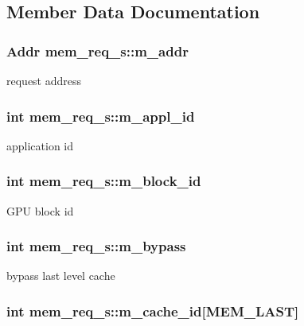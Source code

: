 \subsection{Member Data Documentation}
\hypertarget{structmem__req__s_a835153e595f8931c1259d7074c6f1019}{
\subsubsection[{m\_\-addr}]{\setlength{\rightskip}{0pt plus 5cm}Addr {\bf mem\_\-req\_\-s::m\_\-addr}}}
\label{structmem__req__s_a835153e595f8931c1259d7074c6f1019}
request address \hypertarget{structmem__req__s_a256acada11160343b8fd7b0f410c80c8}{
\subsubsection[{m\_\-appl\_\-id}]{\setlength{\rightskip}{0pt plus 5cm}int {\bf mem\_\-req\_\-s::m\_\-appl\_\-id}}}
\label{structmem__req__s_a256acada11160343b8fd7b0f410c80c8}
application id \hypertarget{structmem__req__s_ad160765e9454b1e36dc188805585a3ff}{
\subsubsection[{m\_\-block\_\-id}]{\setlength{\rightskip}{0pt plus 5cm}int {\bf mem\_\-req\_\-s::m\_\-block\_\-id}}}
\label{structmem__req__s_ad160765e9454b1e36dc188805585a3ff}
GPU block id \hypertarget{structmem__req__s_a45680e38670bb6ed3b65f11dc22e4c4a}{
\subsubsection[{m\_\-bypass}]{\setlength{\rightskip}{0pt plus 5cm}int {\bf mem\_\-req\_\-s::m\_\-bypass}}}
\label{structmem__req__s_a45680e38670bb6ed3b65f11dc22e4c4a}
bypass last level cache \hypertarget{structmem__req__s_a136b8b016a5e922dbc766490e5478b3e}{
\subsubsection[{m\_\-cache\_\-id}]{\setlength{\rightskip}{0pt plus 5cm}int {\bf mem\_\-req\_\-s::m\_\-cache\_\-id}\mbox{[}MEM\_\-LAST\mbox{]}}}
